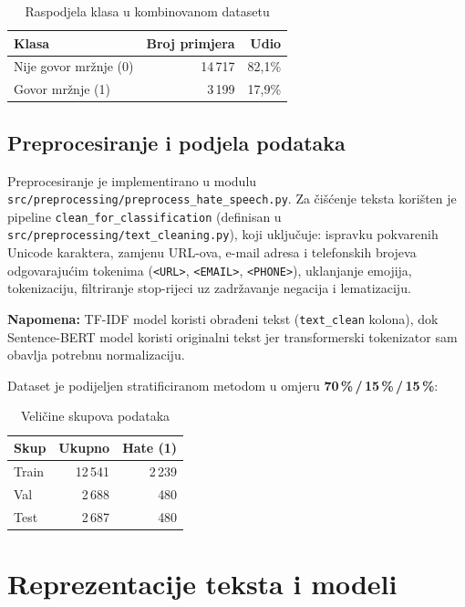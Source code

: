 \begin{table}[h]
\centering
\caption{Raspodjela klasa u kombinovanom datasetu}
\label{tab:hate_dist}
\begin{tabular}{lrr}
\hline
\textbf{Klasa} & \textbf{Broj primjera} & \textbf{Udio} \\
\hline
Nije govor mržnje (0) & 14\,717 & 82{,}1\% \\
Govor mržnje (1) & 3\,199 & 17{,}9\% \\
\hline
\end{tabular}
\end{table}

\subsection{Preprocesiranje i podjela podataka}

Preprocesiranje je implementirano u modulu \texttt{src/preprocessing/preprocess\_hate\_speech.py}. Za čišćenje teksta korišten je pipeline \texttt{clean\_for\_classification} (definisan u \texttt{src/preprocessing/text\_cleaning.py}), koji uključuje: ispravku pokvarenih Unicode karaktera, zamjenu URL-ova, e-mail adresa i telefonskih brojeva odgovarajućim tokenima (\texttt{<URL>}, \texttt{<EMAIL>}, \texttt{<PHONE>}), uklanjanje emojija, tokenizaciju, filtriranje stop-rijeci uz zadržavanje negacija i lematizaciju.

\textbf{Napomena:} TF-IDF model koristi obrađeni tekst (\texttt{text\_clean} kolona), dok Sentence-BERT model koristi originalni tekst jer transformerski tokenizator sam obavlja potrebnu normalizaciju.

Dataset je podijeljen stratificiranom metodom u omjeru \textbf{70\,\%\,/\,15\,\%\,/\,15\,\%}:

\begin{table}[h]
\centering
\caption{Veličine skupova podataka}
\label{tab:hate_splits}
\begin{tabular}{lrr}
\hline
\textbf{Skup} & \textbf{Ukupno} & \textbf{Hate (1)} \\
\hline
Train & 12\,541 & 2\,239 \\
Val   & 2\,688  & 480   \\
Test  & 2\,687  & 480   \\
\hline
\end{tabular}
\end{table}

\section{Reprezentacije teksta i modeli}

